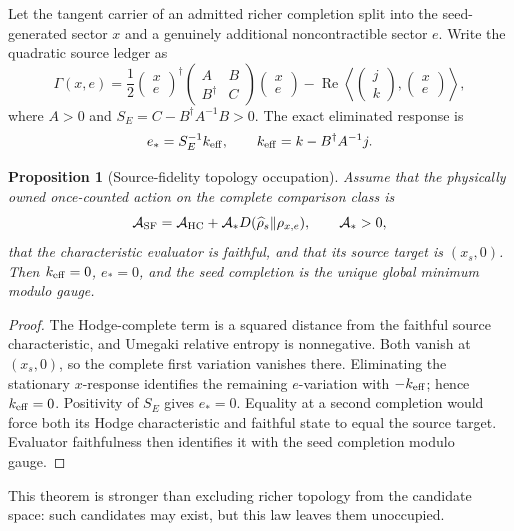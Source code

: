 \documentclass[11pt]{article}
\newtheorem{proposition}{Proposition}
\begin{document}
Let the tangent carrier of an admitted richer completion split into the
seed-generated sector \(x\) and a genuinely additional noncontractible sector
\(e\).  Write the quadratic source ledger as
\[
 \Gamma(x,e)=\frac12
 \begin{pmatrix}x\\e\end{pmatrix}^{\!\dagger}
 \begin{pmatrix}A&B\\B^\dagger&C\end{pmatrix}
 \begin{pmatrix}x\\e\end{pmatrix}
 -\operatorname{Re}\left\langle
 \begin{pmatrix}j\\k\end{pmatrix},
 \begin{pmatrix}x\\e\end{pmatrix}\right\rangle ,
\]
where \(A>0\) and
\(S_E=C-B^\dagger A^{-1}B>0\).  The exact eliminated response is
\[
 e_*=S_E^{-1}k_{\rm eff},\qquad
 k_{\rm eff}=k-B^\dagger A^{-1}j.
\]

\begin{proposition}[Source-fidelity topology occupation]
Assume that the physically owned once-counted action on the complete
comparison class is
\[
 \mathcal A_{\rm SF}
 =\mathcal A_{\rm HC}
 +\mathcal A_*D(\widehat\rho_s\|\rho_{x,e}),
 \qquad \mathcal A_*>0,
\]
that the characteristic evaluator is faithful, and that its source target is
\((x_s,0)\).  Then \(k_{\rm eff}=0\), \(e_*=0\), and the seed completion is
the unique global minimum modulo gauge.
\end{proposition}

\begin{proof}
The Hodge-complete term is a squared distance from the faithful source
characteristic, and Umegaki relative entropy is nonnegative.  Both vanish at
\((x_s,0)\), so the complete first variation vanishes there.  Eliminating the
stationary \(x\)-response identifies the remaining \(e\)-variation with
\(-k_{\rm eff}\); hence \(k_{\rm eff}=0\).  Positivity of \(S_E\) gives
\(e_*=0\).  Equality at a second completion would force both its Hodge
characteristic and faithful state to equal the source target.  Evaluator
faithfulness then identifies it with the seed completion modulo gauge.
\end{proof}

This theorem is stronger than excluding richer topology from the candidate
space: such candidates may exist, but this law leaves them unoccupied.
\end{document}

